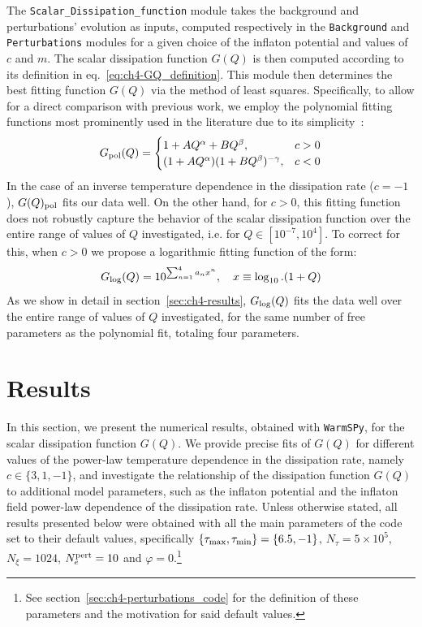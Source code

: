 The \texttt{Scalar\_Dissipation\_function} module takes the background and perturbations' evolution as inputs, computed respectively in the \texttt{Background} and \texttt{Perturbations} modules for a given choice of the inflaton potential and values of $c$ and $m$. The scalar dissipation function $G(Q)$ is then computed according to its definition in eq.~\eqref{eq:ch4-GQ_definition}. This module then determines the best fitting function $G(Q)$ via the method of least squares. Specifically, to allow for a direct comparison with previous work, we employ the polynomial fitting functions most prominently used in the literature due to its simplicity~\cite{Bastero-Gil:2016qru,Benetti:2016jhf,Montefalcone:2022jfw, Motaharfar:2018zyb}:
\begin{equation}
G_{\rm{pol}}(Q)=\begin{cases}
1+AQ^{\alpha}+BQ^{\beta},  & c>0 \\
(1+AQ^{\alpha})(1+BQ^{\beta})^{-\gamma}, & c<0
\end{cases}\label{eq:ch4-GQ_pol} 
\end{equation}
In the case of an inverse temperature
dependence in the dissipation rate ($c=-1$), $G(Q)_{\rm{pol}}$ fits our data well. On the other hand, for $c>0$, this fitting function does not robustly capture the behavior of the scalar dissipation function over the entire range of values of $Q$ investigated, i.e. for $Q\in [10^{-7}, 10^{4}]$. To correct for this, when $c>0$ we propose a logarithmic fitting function of the form:
\begin{equation}
    G_{\rm{log}}(Q)=10^{\sum_{n=1}^4 a_n x^n}, \quad x\equiv\log_{10}.(1+Q)\label{eq:ch4-GQ_log}
\end{equation}
As we show in detail in section~\ref{sec:ch4-results}, $G_{\rm{log}}(Q)$ fits the data well over the entire range of values of $Q$ investigated, for the same number of free parameters as the polynomial fit, totaling four parameters.

\section{Results \label{sec:ch4-results}}

In this section, we present the numerical results, obtained with \texttt{WarmSPy}, for the scalar dissipation function $G(Q)$. We provide precise fits of $G(Q)$ for different values of the power-law temperature
dependence in the dissipation rate, namely $c\in \{3, 1, -1\}$, and investigate the relationship of the dissipation function $G(Q)$
to additional model parameters, such as the inflaton potential and the inflaton field power-law dependence of the dissipation rate. Unless otherwise stated, all results presented below were obtained with all the main parameters of the code set to their default values, specifically $\{\tau_{\rm{max}},\tau_{\rm{min}}\}=\{6.5,-1\}$, $N_\tau=5\times10^{5}$, $N_\xi=1024$, $N_e^{\rm{pert}}=10$ and $\varphi=0$.\footnote{See section~\ref{sec:ch4-perturbations_code} for the definition of these parameters and the motivation for said default values.}


